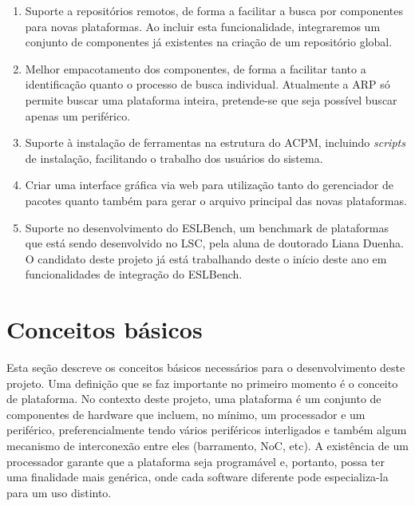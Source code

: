 \documentclass[10pt,a4paper]{article}
\begin{document}
\begin{enumerate}
\item Suporte a repositórios remotos, de forma a facilitar a busca por
  componentes para novas plataformas. Ao incluir esta funcionalidade,
  integraremos um conjunto de componentes já existentes na criação de
  um repositório global.

\item Melhor empacotamento dos componentes, de forma a facilitar tanto
  a identificação quanto o processo de busca individual. Atualmente a
  ARP só permite buscar uma plataforma inteira, pretende-se que seja
  possível buscar apenas um periférico.

\item Suporte à instalação de ferramentas na estrutura do ACPM,
  incluindo \textit{scripts} de instalação, facilitando o trabalho dos
  usuários do sistema.

\item Criar uma interface gráfica via web para utilização tanto do
  gerenciador de pacotes quanto também para gerar o arquivo principal
  das novas plataformas.

\item Suporte no desenvolvimento do ESLBench, um benchmark de
  plataformas que está sendo desenvolvido no LSC, pela aluna de
  doutorado Liana Duenha. O candidato deste projeto já está
  trabalhando deste o início deste ano em funcionalidades de
  integração do ESLBench.

\end{enumerate}
        
\section{Conceitos básicos}

Esta seção descreve os conceitos básicos necessários para o
desenvolvimento deste projeto. Uma definição que se faz importante no
primeiro momento é o conceito de plataforma. No contexto deste
projeto, uma plataforma é um conjunto de componentes de hardware que
incluem, no mínimo, um processador e um periférico, preferencialmente
tendo vários periféricos interligados e também algum mecanismo de
interconexão entre eles (barramento, NoC, etc). A existência de um
processador garante que a plataforma seja programável e, portanto,
possa ter uma finalidade mais genérica, onde cada software diferente
pode especializa-la para um uso distinto.
\end{document}

